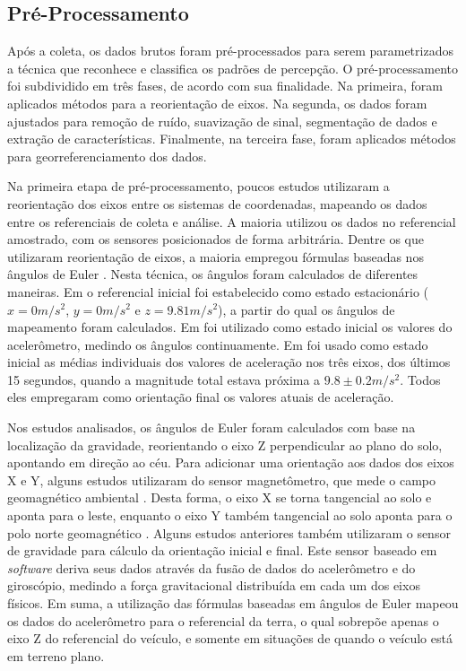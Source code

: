 \subsection{Pré-Processamento}

Após a coleta, os dados brutos foram pré-processados para serem parametrizados a técnica que reconhece e classifica os padrões de percepção. O pré-processamento foi subdividido em três fases, de acordo com sua finalidade. Na primeira, foram aplicados métodos para a reorientação de eixos. Na segunda, os dados foram ajustados para remoção de ruído, suavização de sinal, segmentação de dados e extração de características. Finalmente, na terceira fase, foram aplicados métodos para georreferenciamento dos dados.

Na primeira etapa de pré-processamento, poucos estudos utilizaram a reorientação dos eixos entre os sistemas de coordenadas, mapeando os dados entre os referenciais de coleta e análise. A maioria utilizou os dados no referencial amostrado, com os sensores posicionados de forma arbitrária. Dentre os que utilizaram reorientação de eixos, a maioria empregou fórmulas baseadas nos ângulos de Euler \cite{Li2018,Orhan2013,Singh2017,Vittorio2014,Vlahogianni2017}. Nesta técnica, os ângulos foram calculados de diferentes maneiras. Em \cite{Singh2017,Orhan2013,Vittorio2014} o referencial inicial foi estabelecido como estado estacionário ($x=0m/s^2$, $y=0m/s^2$ e $z=9.81m/s^2$), a partir do qual os ângulos de mapeamento foram calculados. Em \cite{Li2018} foi utilizado como estado inicial os valores do acelerômetro, medindo os ângulos continuamente. Em \cite{Singh2018} foi usado como estado inicial as médias individuais dos valores de aceleração nos três eixos, dos últimos 15 segundos, quando a magnitude total estava próxima a $9.8 \pm 0.2 m/s^2$. Todos eles empregaram como orientação final os valores atuais de aceleração.

Nos estudos analisados, os ângulos de Euler foram calculados com base na localização da gravidade, reorientando o eixo Z perpendicular ao plano do solo, apontando em direção ao céu. Para adicionar uma orientação aos dados dos eixos X e Y, alguns estudos utilizaram do sensor magnetômetro, que mede o campo geomagnético ambiental \cite{Sattar2018}. Desta forma, o eixo X se torna tangencial ao solo e aponta para o leste, enquanto o eixo Y também tangencial ao solo aponta para o polo norte geomagnético \cite{Sattar2018}. Alguns estudos anteriores também utilizaram o sensor de gravidade para cálculo da orientação inicial e final. Este sensor baseado em \textit{software} deriva seus dados através da fusão de dados do acelerômetro e do giroscópio, medindo a força gravitacional distribuída em cada um dos eixos físicos. Em suma, a utilização das fórmulas baseadas em ângulos de Euler mapeou os dados do acelerômetro para o referencial da terra, o qual sobrepõe apenas o eixo Z do referencial do veículo, e somente em situações de quando o veículo está em terreno plano.

